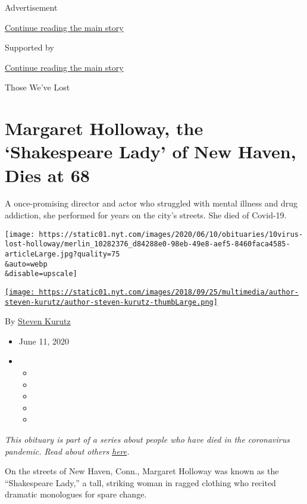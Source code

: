 Advertisement

\protect\hyperlink{after-top}{Continue reading the main story}

Supported by

\protect\hyperlink{after-sponsor}{Continue reading the main story}

Those We've Lost

\hypertarget{margaret-holloway-the-shakespeare-lady-of-new-haven-dies-at-68}{%
\section{Margaret Holloway, the `Shakespeare Lady' of New Haven, Dies at
68}\label{margaret-holloway-the-shakespeare-lady-of-new-haven-dies-at-68}}

A once-promising director and actor who struggled with mental illness
and drug addiction, she performed for years on the city's streets. She
died of Covid-19.

\texttt{[image: https://static01.nyt.com/images/2020/06/10/obituaries/10virus-lost-holloway/merlin\_10282376\_d84288e0-98eb-49e8-aef5-8460faca4585-articleLarge.jpg?quality=75\\\&auto=webp\\\&disable=upscale]}

\href{https://www.nytimes.com/by/steven-kurutz}{\texttt{[image: https://static01.nyt.com/images/2018/09/25/multimedia/author-steven-kurutz/author-steven-kurutz-thumbLarge.png]}}

By \href{https://www.nytimes.com/by/steven-kurutz}{Steven Kurutz}

\begin{itemize}
\item
  June 11, 2020
\item
  \begin{itemize}
  \item
  \item
  \item
  \item
  \item
  \end{itemize}
\end{itemize}

\emph{This obituary is part of a series about people who have died in
the coronavirus pandemic. Read about others}
\href{https://www.nytimes.com/interactive/2020/obituaries/people-died-coronavirus-obituaries.html}{\emph{here}}\emph{.}

On the streets of New Haven, Conn., Margaret Holloway was known as the
``Shakespeare Lady,'' a tall, striking woman in ragged clothing who
recited dramatic monologues for spare change.

